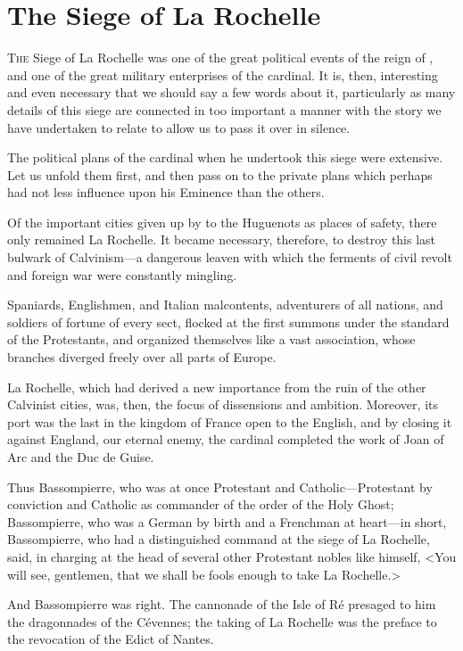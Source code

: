 
\chapter{The Siege of La Rochelle}

\lettrine{T}{he} Siege of La Rochelle was one of the great political events of the reign of , and one of the great military enterprises of the cardinal. It is, then, interesting and even necessary that we should say a few words about it, particularly as many details of this siege are connected in too important a manner with the story we have undertaken to relate to allow us to pass it over in silence. 

The political plans of the cardinal when he undertook this siege were extensive. Let us unfold them first, and then pass on to the private plans which perhaps had not less influence upon his Eminence than the others. 

Of the important cities given up by  to the Huguenots as places of safety, there only remained La Rochelle. It became necessary, therefore, to destroy this last bulwark of Calvinism—a dangerous leaven with which the ferments of civil revolt and foreign war were constantly mingling. 

Spaniards, Englishmen, and Italian malcontents, adventurers of all nations, and soldiers of fortune of every sect, flocked at the first summons under the standard of the Protestants, and organized themselves like a vast association, whose branches diverged freely over all parts of Europe. 

La Rochelle, which had derived a new importance from the ruin of the other Calvinist cities, was, then, the focus of dissensions and ambition. Moreover, its port was the last in the kingdom of France open to the English, and by closing it against England, our eternal enemy, the cardinal completed the work of Joan of Arc and the Duc de Guise. 

Thus Bassompierre, who was at once Protestant and Catholic—Protestant by conviction and Catholic as commander of the order of the Holy Ghost; Bassompierre, who was a German by birth and a Frenchman at heart—in short, Bassompierre, who had a distinguished command at the siege of La Rochelle, said, in charging at the head of several other Protestant nobles like himself, <You will see, gentlemen, that we shall be fools enough to take La Rochelle.> 

And Bassompierre was right. The cannonade of the Isle of Ré presaged to him the dragonnades of the Cévennes; the taking of La Rochelle was the preface to the revocation of the Edict of Nantes. 

